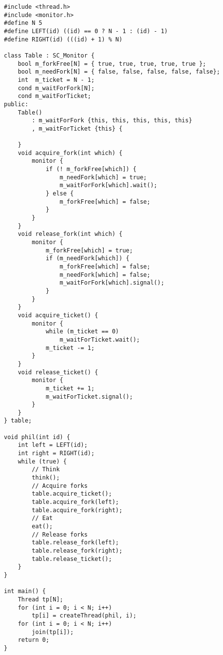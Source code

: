 \begin{lstlisting}
#include <thread.h>
#include <monitor.h>
#define N 5
#define LEFT(id) ((id) == 0 ? N - 1 : (id) - 1)
#define RIGHT(id) (((id) + 1) % N)

class Table : SC_Monitor {
    bool m_forkFree[N] = { true, true, true, true, true };
    bool m_needFork[N] = { false, false, false, false, false};
    int  m_ticket = N - 1;
    cond m_waitForFork[N];
    cond m_waitForTicket;
public:
    Table() 
        : m_waitForFork {this, this, this, this, this}
        , m_waitForTicket {this} {
        
    }
    void acquire_fork(int which) {
        monitor {
            if (! m_forkFree[which]) {
                m_needFork[which] = true;
                m_waitForFork[which].wait();
            } else {
                m_forkFree[which] = false;
            }
        }
    }
    void release_fork(int which) {
        monitor {
            m_forkFree[which] = true;
            if (m_needFork[which]) {
                m_forkFree[which] = false;
                m_needFork[which] = false;
                m_waitForFork[which].signal();
            }
        }
    }
    void acquire_ticket() {
        monitor {
            while (m_ticket == 0)
                m_waitForTicket.wait();
            m_ticket -= 1;
        }
    }
    void release_ticket() {
        monitor {
            m_ticket += 1;
            m_waitForTicket.signal();
        }
    }
} table;

void phil(int id) {
    int left = LEFT(id);
    int right = RIGHT(id);
    while (true) {
        // Think
        think();
        // Acquire forks
        table.acquire_ticket();
        table.acquire_fork(left);
        table.acquire_fork(right);
        // Eat
        eat();
        // Release forks
        table.release_fork(left);
        table.release_fork(right);
        table.release_ticket();
    }
}

int main() {
    Thread tp[N];
    for (int i = 0; i < N; i++) 
        tp[i] = createThread(phil, i);
    for (int i = 0; i < N; i++) 
        join(tp[i]);
    return 0;
}

\end{lstlisting}

